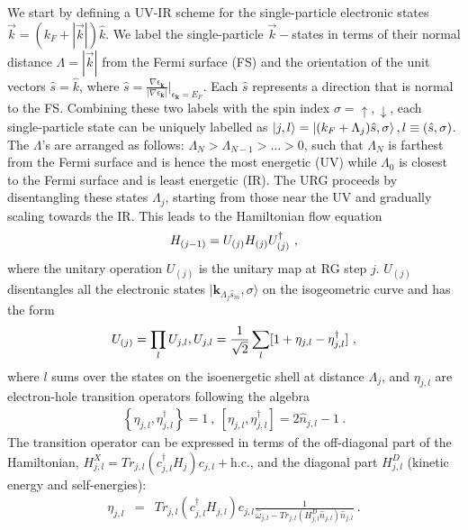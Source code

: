 \documentclass[10pt]{iopart}
\begin{document}
We start by defining a UV-IR scheme for the single-particle electronic states \(\vec k = (k_F + |\vec k|) \hat k\). We label the single-particle \(\vec k-\)states in terms of their normal distance $\Lambda = |\vec k|$ from the Fermi surface (FS) and the orientation of the unit vectors $\hat{s} = \hat k$, where $\hat{s}=\frac{\nabla\epsilon_{\mathbf{k}}}{|\nabla\epsilon_{\mathbf{k}}|}|_{\epsilon_{\mathbf{k}}=E_{F}}$. Each \(\hat s\) represents a direction that is normal to the FS. Combining these two labels with the spin index \(\sigma=\uparrow,\downarrow\), each single-particle state can be uniquely labelled as $\ket{j,l} = \ket{(k_F + \Lambda_j) \hat s,\sigma}, l\equiv (\hat{s},\sigma)$. The $\Lambda$'s are arranged as follows: $\Lambda_{N}>\Lambda_{N-1}>\ldots>0$, such that \(\Lambda_N\) is farthest from the Fermi surface and is hence the most energetic (UV) while \(\Lambda_0\) is closest to the Fermi surface and is least energetic (IR). The URG proceeds by disentangling these states \(\Lambda_j\), starting from those near the UV and gradually scaling towards the IR. This leads to the Hamiltonian flow equation~\cite{anirbanurg1}
\begin{eqnarray}
\centering
\label{urg_map}
H_{(j-1)}=U_{(j)}H_{(j)}U^{\dagger}_{(j)}~,
\end{eqnarray}
where the unitary operation $U_{(j)}$ is the unitary map at RG step $j$. 
$U_{(j)}$ disentangles all the electronic states 
$|\mathbf{k}_{\Lambda_{j}\hat{s}_{m}},\sigma\rangle$
on the isogeometric curve and has the form~\cite{anirbanmott1,anirbanurg1}
\begin{eqnarray}
\centering U_{(j)}=\prod_{l}U_{j,l}, U_{j,l}=\frac{1}{\sqrt{2}}\sum_l [1+\eta_{j,l}-\eta^{\dagger}_{j,l}]~,
\end{eqnarray}
where \(l\) sums over the states on the isoenergetic shell at distance \(\Lambda_j\), and $\eta_{j,l}$ are electron-hole transition operators following the algebra
\begin{eqnarray}
	\left\{\eta_{j,l},\eta_{j,l}^{\dagger}\right\} = 1~,~\left[\eta_{j,l},\eta_{j,l}^{\dagger}\right] = 2\hat n_{j,l} - 1~.
\end{eqnarray}
The transition operator can be expressed in terms of the off-diagonal part of the Hamiltonian, \(H^X_{j,l} = Tr_{j,l}(c^{\dagger}_{j,l}H_{j})c_{j,l} + \text{h.c.}\), and the diagonal part \(H^D_{j,l}\) (kinetic energy and self-energies):
\begin{eqnarray}
	\eta_{j,l}&=&Tr_{j,l}(c^{\dagger}_{j,l}H_{j,l})c_{j,l}\frac{1}{\hat{\omega}_{j,l}-Tr_{j,l}(H^{D}_{j,l}\hat{n}_{j,l})\hat{n}_{j,l}}~.\label{e-TransOp}
\end{eqnarray}
\end{document}
